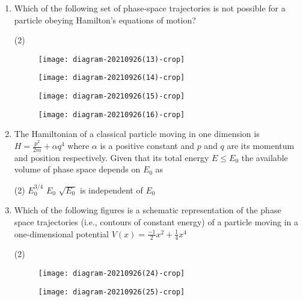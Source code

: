 \begin{enumerate}
	\item Which of the following set of phase-space trajectories is not possible for a particle obeying Hamilton's equations of motion?
	{}
	\begin{tasks}(2)
		\task[\textbf{A.}]\begin{figure}[H]
			\centering
			\texttt{[image: diagram-20210926(13)-crop]}
		\end{figure}
		\task[\textbf{B.}]\begin{figure}[H]
			\centering
			\texttt{[image: diagram-20210926(14)-crop]}
		\end{figure}
		\task[\textbf{C.}]\begin{figure}[H]
			\centering
			\texttt{[image: diagram-20210926(15)-crop]}
		\end{figure}
		\task[\textbf{D.}]\begin{figure}[H]
			\centering
			\texttt{[image: diagram-20210926(16)-crop]}
		\end{figure}
	\end{tasks}
	\item The Hamiltonian of a classical particle moving in one dimension is $H=\frac{p^{2}}{2 m}+\alpha q^{4}$ where $\alpha$ is a positive constant and $p$ and $q$ are its momentum and position respectively. Given that its total energy $E \leq E_{0}$ the available volume of phase space depends on $E_{0}$ as
	{}
	\begin{tasks}(2)
		\task[\textbf{A.}] $E_{0}^{3 / 4}$
		\task[\textbf{B.}]$E_{0}$
		\task[\textbf{C.}]$\sqrt{E_{0}}$
		\task[\textbf{D.}]is independent of $E_{0}$
	\end{tasks}
	\item Which of the following figures is a schematic representation of the phase space trajectories (i.e., contours of constant energy) of a particle moving in a one-dimensional potential $V(x)=\frac{-1}{2} x^{2}+\frac{1}{4} x^{4}$
	{}
	\begin{tasks}(2)
		\task[\textbf{A.}]\begin{figure}[H]
			\centering
			\texttt{[image: diagram-20210926(24)-crop]}
		\end{figure}
		\task[\textbf{B.}]\begin{figure}[H]
			\centering
			\texttt{[image: diagram-20210926(25)-crop]}
		\end{figure}
		\task[\textbf{C.}]\begin{figure}[H]

\end{figure}
\end{tasks}
\end{enumerate}
